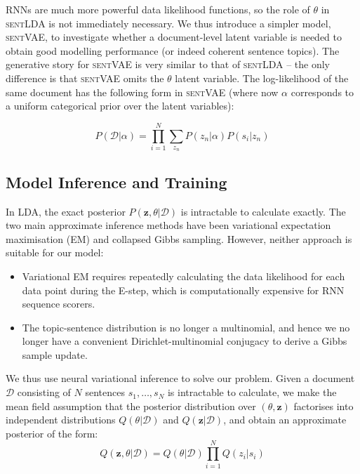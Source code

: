 RNNs are much more powerful data likelihood functions, so the role of $\theta$ in \textsc{sentLDA} is not immediately necessary. We thus introduce a simpler model, \textsc{sentVAE}, to investigate whether a document-level latent variable is needed to obtain good modelling performance (or indeed coherent sentence topics). The generative story for \textsc{sentVAE} is very similar to that of \textsc{sentLDA} -- the only difference is that \textsc{sentVAE} omits the $\theta$ latent variable. The log-likelihood of the same document has the following form in \textsc{sentVAE} (where now $\alpha$ corresponds to a uniform categorical prior over the latent variables):

\begin{dmath}
P(\mathcal{D}|\alpha) = \prod_{i=1}^N \sum_{z_n} P(z_n | \alpha) P(s_i|z_n)
\end{dmath}

\subsection{Model Inference and Training}

In LDA, the exact posterior $P(\mathbf{z}, \theta | \mathcal{D})$ is intractable to calculate exactly. The two main approximate inference methods have been variational expectation maximisation (EM) and collapsed Gibbs sampling. However, neither approach is suitable for our model:
\begin{itemize}
    \item Variational EM requires repeatedly calculating the data likelihood for each data point during the E-step, which is computationally expensive for RNN sequence scorers.
    
    \item The topic-sentence distribution is no longer a multinomial, and hence we no longer have a convenient Dirichlet-multinomial conjugacy to derive a Gibbs sample update.
\end{itemize}

We thus use neural variational inference \citep{Kingma:14,Mnih:14,Rezende:14} to solve our problem. Given a document $\mathcal{D}$ consisting of $N$ sentences $s_1, \dots, s_N$ is intractable to calculate, we make the mean field assumption that the posterior distribution over $(\theta, \mathbf{z})$ factorises into independent distributions $Q(\theta|\mathcal{D})$ and $Q(\mathbf{z} | \mathcal{D})$, and obtain an approximate posterior of the form:
\begin{equation}
Q(\mathbf{z}, \theta | \mathcal{D}) = Q(\theta|\mathcal{D})\prod_{i=1}^{N} Q(z_i|s_i)
\end{equation}

